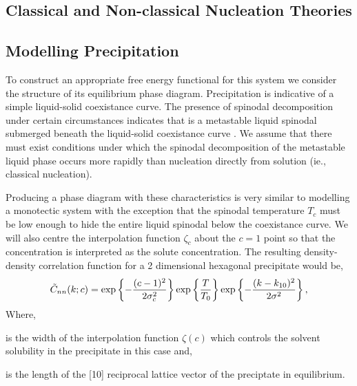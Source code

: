 
\subsection{Classical and Non-classical Nucleation Theories} %




\subsection{Modelling Precipitation} %


To construct an appropriate free energy functional for this system we consider
the structure of its equilibrium phase diagram. Precipitation is indicative of
a simple liquid-solid coexistance curve. The presence of spinodal decomposition
under certain circumstances indicates that is a metastable liquid spinodal
submerged beneath the liquid-solid coexistance curve \cite{DAVEY13}. We assume
that there must exist conditions under which the spinodal decomposition of the
metastable liquid phase occurs more rapidly than nucleation directly from
solution (ie., classical nucleation).


Producing a phase diagram with these characteristics is very similar to
modelling a monotectic system with the exception that the spinodal temperature
$T_c$ must be low enough to hide the entire liquid spinodal below the
coexistance curve.  We will also centre the interpolation function $\zeta_c$
about the $c = 1$ point so that the concentration is interpreted as the solute
concentration. The resulting density-density correlation function for a 2
dimensional hexagonal precipitate would be,
%
\begin{equation}
    \label{eq:precip_corr}
    \tilde{C}_{nn}(k; c) = \exp\left\lbrace - \frac{(c - 1)^2}{2\sigma_c^2}\right\rbrace
        \exp\left\lbrace \frac{T}{T_0} \right\rbrace 
        \exp\left\lbrace - \frac{(k - k_{10})^2}{2\sigma^2} \right\rbrace,
\end{equation}
%
Where,
\begin{description}[labelwidth=1cm, align=right]
    \item[$\sigma_c$] is the width of the interpolation function $\zeta(c)$
        which controls the solvent solubility in the precipitate in this case
        and,
    \item[$k_{10}$] is the length of the [10] reciprocal lattice vector of the
        preciptate in equilibrium.
\end{description}

